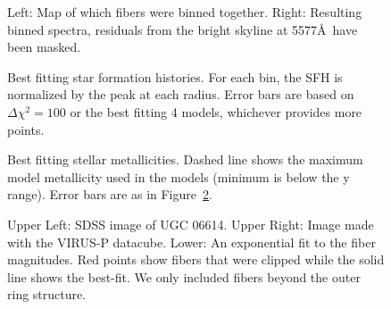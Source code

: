 \documentclass[12pt,preprint]{aastex}
\begin{document}
\begin{figure}
\caption{Left:  Map of which fibers were binned together.  Right:  Resulting binned spectra, residuals from the bright skyline at 5577\AA\ have been masked. \label{malin2_binmap}}
\end{figure}




\begin{figure}
\caption{ Best fitting star formation histories.  For each bin, the SFH is normalized by the peak at each radius.  Error bars are based on $\Delta\chi^2=100$ or the best fitting 4 models, whichever provides more points.  \label{sfh_malin2} }
\end{figure}


\begin{figure}
\caption{Best fitting stellar metallicities.   Dashed line shows the maximum model metallicity used in the models (minimum is below the y range).  Error bars are as in Figure~\ref{sfh_malin2}. \label{metal_malin2}}
\end{figure}


\begin{figure}
\caption{Upper Left:  SDSS image of UGC 06614.  Upper Right:  Image made with the VIRUS-P datacube.  Lower:  An exponential fit to the fiber magnitudes.  Red points show fibers that were clipped while the solid line shows the best-fit.  We only included fibers beyond the outer ring structure.  \label{ugc_fibers} }
\end{figure}

\end{document}
